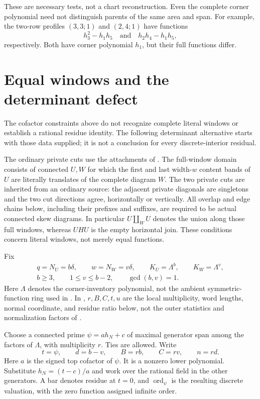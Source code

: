 \documentclass[11pt,a4paper]{amsart}
\numberwithin{equation}{section}
\theoremstyle{plain}
\theoremstyle{definition}
\begin{document}
These are necessary tests, not a chart reconstruction.  Even the complete corner polynomial need not distinguish parents of the same area and span.  For example, the two-row profiles \((3,3;1)\) and \((2,4;1)\) have functions
\begin{equation*}
 h_3^2-h_1h_5\quad\text{and}\quad h_2h_4-h_1h_5,
\end{equation*}
respectively.  Both have corner polynomial \(h_1\), but their full functions differ.

\section{Equal windows and the determinant defect}\label{sec:normal-chart}

The cofactor constraints above do not recognize complete literal windows or establish a rational residue identity.  The following determinant alternative starts with those data supplied; it is not a conclusion for every discrete-interior residual.

The ordinary private cuts use the attachments of .  The full-window domain consists of connected \(U,W\) for which the first and last width-\(w\) content bands of \(U\) are literally translates of the complete diagram \(W\).  The two private cuts are inherited from an ordinary source: the adjacent private diagonals are singletons and the two cut directions agree, horizontally or vertically.  All overlap and edge chains below, including their prefixes and suffixes, are required to be actual connected skew diagrams.  In particular \(U\amalg_W U\) denotes the union along those full windows, whereas \(UHU\) is the empty horizontal join.  These conditions concern literal windows, not merely equal functions.

Fix
\[
 \begin{gathered}
 q=N_U=b\delta,\qquad w=N_W=v\delta,\qquad
 K_U=\Lambda^b,\qquad K_W=\Lambda^v,\\
 b\ge3,\qquad1\le v\le b-2,\qquad\gcd(b,v)=1.
 \end{gathered}
\]
Here \(\Lambda\) denotes the corner-inventory polynomial, not the ambient symmetric-function ring used in .  In , \(r,B,C,t,u\) are the local multiplicity, word lengths, normal coordinate, and residue ratio below, not the outer statistics and normalization factors of .

Choose a connected prime \(\psi=a h_N+c\) of maximal generator span among the factors of \(\Lambda\), with multiplicity \(r\).  Ties are allowed.  Write
\[
 t=\psi,\qquad d=b-v,\qquad B=rb,\qquad C=rv,\qquad n=rd.
\]
Here \(a\) is the signed top cofactor of \(\psi\).  It is a nonzero lower polynomial.  Substitute \(h_N=(t-c)/a\) and work over the rational field in the other generators.  A bar denotes residue at \(t=0\), and \(\operatorname{ord}_\psi\) is the resulting discrete valuation, with the zero function assigned infinite order.
\end{document}
